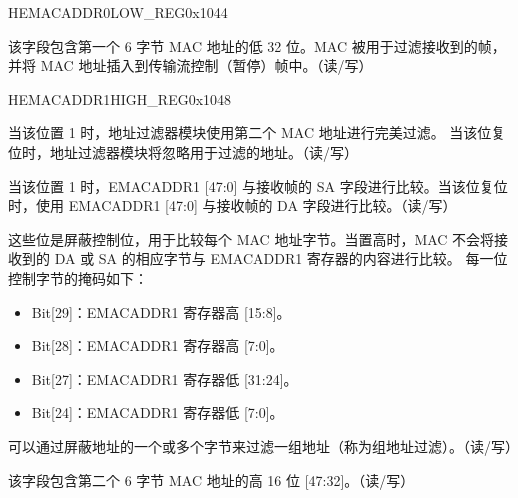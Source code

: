 \begin{register}{H}{EMACADDR0LOW\_REG}{0x1044}\label{regdesc:EMACADDR0LOWREG}
%
\regnewline%
\begin{regdesc}\begin{reglist}
\item [EMACADDR0LOW\_REG] 该字段包含第一个 6 字节 MAC 地址的低 32 位。MAC 被用于过滤接收到的帧，并将 MAC 地址插入到传输流控制（暂停）帧中。（读/写）
\end{reglist}\end{regdesc}
\end{register}


\begin{register}{H}{EMACADDR1HIGH\_REG}{0x1048}\label{regdesc:EMACADDR1HIGHREG}
%
%
%
%
%
\regnewline%
\begin{regdesc}\begin{reglist}
\item [ADDRESS\_ENABLE1]当该位置 1 时，地址过滤器模块使用第二个 MAC 地址进行完美过滤。 当该位复位时，地址过滤器模块将忽略用于过滤的地址。（读/写）
\item [SOURCE\_ADDRESS]当该位置 1 时，EMACADDR1 [47:0] 与接收帧的 SA 字段进行比较。当该位复位时，使用 EMACADDR1 [47:0] 与接收帧的 DA 字段进行比较。（读/写）
\item [MASK\_BYTE\_CONTROL] 这些位是屏蔽控制位，用于比较每个 MAC 地址字节。当置高时，MAC 不会将接收到的 DA 或 SA 的相应字节与 EMACADDR1 寄存器的内容进行比较。 每一位控制字节的掩码如下：
\begin{itemize}
\item Bit[29]：EMACADDR1 寄存器高 [15:8]。\item Bit[28]：EMACADDR1 寄存器高 [7:0]。\item Bit[27]：EMACADDR1 寄存器低 [31:24]。\item Bit[24]：EMACADDR1 寄存器低 [7:0]。\end{itemize}
可以通过屏蔽地址的一个或多个字节来过滤一组地址（称为组地址过滤）。（读/写）
\item [MAC\_ADDRESS1\_HI] 该字段包含第二个 6 字节 MAC 地址的高 16 位 [47:32]。（读/写）
\end{reglist}\end{regdesc}
\end{register}


